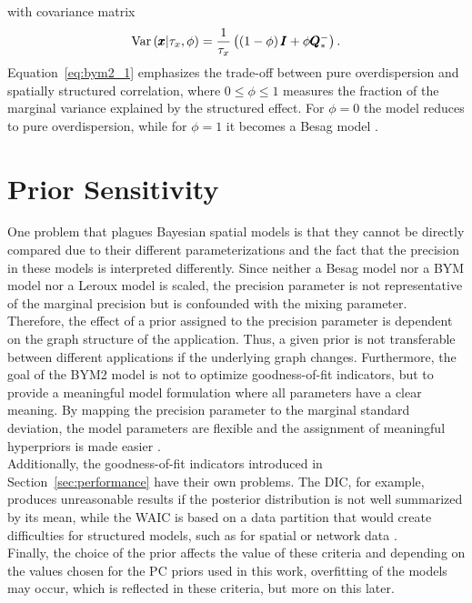 with covariance matrix
\begin{equation}
    \hbox{Var}\left(\pmb{x}|\tau_x,\phi\right)=\frac{1}{\tau_x}\left(\left(1-\phi\right)\pmb{I}+\phi\pmb{Q}_{*}^{-}\right).
\end{equation} \clearpage
Equation~\ref{eq:bym2_1} emphasizes the trade-off between pure overdispersion and spatially structured correlation, where $0\leq\phi\leq1$ measures the fraction of the marginal variance explained by the structured effect. For $\phi=0$ the model reduces to pure overdispersion, while for $\phi=1$ it becomes a Besag model \autocite[][]{sorbye2017penalised, riebler2016intuitive}.
\clearpage
\section{Prior Sensitivity}\label{sec:issues}
One problem that plagues Bayesian spatial models is that they cannot be directly compared due to their different parameterizations and the fact that the precision in these models is interpreted differently. Since neither a Besag model nor a BYM model nor a Leroux model is scaled, the precision parameter is not representative of the marginal precision but is confounded with the mixing parameter. Therefore, the effect of a prior assigned to the precision parameter is dependent on the graph structure of the application. Thus, a given prior is not transferable between different applications if the underlying graph changes. Furthermore, the goal of the BYM2 model is not to optimize goodness-of-fit indicators, but to provide a meaningful model formulation where all parameters have a clear meaning. By mapping the precision parameter to the marginal standard deviation, the model parameters are flexible and the assignment of meaningful hyperpriors is made easier \autocite[][]{riebler2016intuitive}. \\
Additionally, the goodness-of-fit indicators introduced in Section~\ref{sec:performance} have their own problems. The DIC, for example, produces unreasonable results if the posterior distribution is not well summarized by its mean, while the WAIC is based on a data partition that would create difficulties for structured models, such as for spatial or network data \autocite[][]{gelman2014understanding}. \\
Finally, the choice of the prior affects the value of these criteria and depending on the values chosen for the PC priors used in this work, overfitting of the models may occur, which is reflected in these criteria, but more on this later.